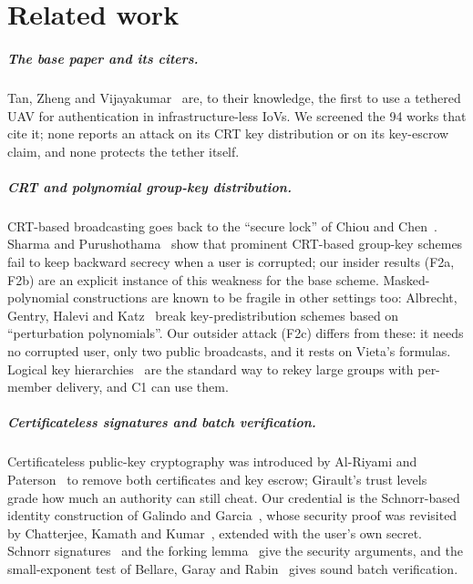 \chapter{Related work}\label{ch:related}
\paragraph{The base paper and its citers.}
Tan, Zheng and Vijayakumar~\cite{tan2023} are, to their knowledge, the first to use a tethered UAV for authentication in infrastructure-less IoVs. We
screened the 94 works that cite it; none reports an attack on its CRT key distribution or on its key-escrow claim, and none protects the tether itself.

\paragraph{CRT and polynomial group-key distribution.}
CRT-based broadcasting goes back to the ``secure lock'' of Chiou and Chen~\cite{chiou89}. Sharma and Purushothama~\cite{sp24} show that prominent
CRT-based group-key schemes fail to keep backward secrecy when a user is corrupted; our insider results (F2a, F2b) are an explicit instance of this
weakness for the base scheme. Masked-polynomial constructions are known to be fragile in other settings too: Albrecht, Gentry, Halevi and
Katz~\cite{agh09} break key-predistribution schemes based on ``perturbation polynomials''. Our outsider attack (F2c) differs from these: it needs no
corrupted user, only two public broadcasts, and it rests on Vieta's formulas. Logical key hierarchies~\cite{wgl98} are the standard way to rekey large
groups with per-member delivery, and C1 can use them.

\paragraph{Certificateless signatures and batch verification.}
Certificateless public-key cryptography was introduced by Al-Riyami and Paterson~\cite{alriyami} to remove both certificates and key escrow; Girault's
trust levels~\cite{girault} grade how much an authority can still cheat. Our credential is the Schnorr-based identity construction of Galindo and
Garcia~\cite{gg09}, whose security proof was revisited by Chatterjee, Kamath and Kumar~\cite{ckk12}, extended with the user's own secret. Schnorr
signatures~\cite{schnorr} and the forking lemma~\cite{forking,bnforking} give the security arguments, and the small-exponent test of Bellare, Garay and
Rabin~\cite{bgr} gives sound batch verification.

